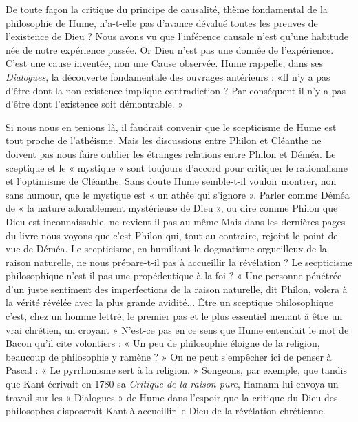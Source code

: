 De toute façon la critique du principe de causalité,
thème fondamental de la philosophie de Hume, n’a-t-elle
pas d’avance dévalué toutes les preuves de l'existence de
Dieu ? Nous avons vu que l’inférence causale n’est qu’une
habitude née de notre expérience passée. Or Dieu n’est
pas une donnée de l’expérience. C’est une cause inventée,
non une Cause observée. Hume rappelle, dans ses {\it Dialogues},
la découverte fondamentale des ouvrages antérieurs :
«Il n’y a pas d’être dont la non-existence implique contradiction ? Par conséquent il n’y a pas d’être dont l’existence
soit démontrable. »

Si nous nous en tenions là, il faudrait convenir que le
scepticisme de Hume est tout proche de l’athéisme. Mais
les discussions entre Philon et Cléanthe ne doivent pas
nous faire oublier les étranges relations entre Philon et
Déméa. Le sceptique et le « mystique » sont toujours
d’accord pour critiquer le rationalisme et l'optimisme de
Cléanthe. Sans doute Hume semble-t-il vouloir montrer,
non sans humour, que le mystique est  « un athée qui
s’ignore ». Parler comme Déméa de « la nature adorablement mystérieuse de Dieu », ou dire comme Philon que
Dieu est inconnaissable, ne revient-il pas au même
Mais dans les dernières pages du livre nous voyons que
c’est Philon qui, tout au contraire, rejoint le point de vue
de Déméa. Le scepticisme, en humiliant le dogmatisme
orgueilleux de la raison naturelle, ne nous prépare-t-il 
pas à accueillir la révélation ? Le secpticisme philosophique
n'est-il pas une propédeutique à la foi ? « Une personne
pénétrée d’un juste sentiment des imperfections de la
raison naturelle, dit Philon, volera à la vérité révélée
avec la plus grande avidité... Être un sceptique philosophique
c’est, chez un homme lettré, le premier pas et le
plus essentiel menant à être un vrai chrétien, un croyant »
N'est-ce pas en ce sens que Hume entendait le mot de
Bacon qu’il cite volontiers : « Un peu de philosophie
éloigne de la religion, beaucoup de philosophie y ramène ? »
On ne peut s’empêcher ici de penser à Pascal : « Le pyrrhonisme
sert à la religion. » Songeons, par exemple, que
tandis que Kant écrivait en 1780 sa {\it Critique de la raison
pure}, Hamann lui envoya un travail sur les « Dialogues » de
Hume dans l’espoir que la critique du Dieu des philosophes
disposerait Kant à accueillir le Dieu de la révélation chrétienne.

